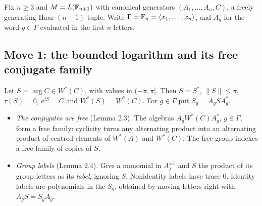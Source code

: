 \label{sec:moves}
Fix $n\ge3$ and $M=L(\mathbb F_{n+1})$ with canonical generators $(A_1,\dots,A_n,C)$, a freely generating Haar $(n+1)$-tuple. Write $\Gamma=\mathbb F_n=\langle x_1,\dots,x_n\rangle$, and
$A_g$ for the word $g\in\Gamma$ evaluated in the first $n$ letters.

\subsection{Move 1: the bounded logarithm and its free conjugate family}
Let $S=\arg C\in W^*(C)$, with values in $(-\pi,\pi]$. Then $S=S^*$, $\|S\|\le\pi$, $\tau(S)=0$, $e^{iS}=C$ and $W^*(S)=W^*(C)$. For $g\in\Gamma$ put $S_g=A_gSA_g^*$.
\begin{itemize}[leftmargin=*]
\item \emph{The conjugates are free} (Lemma 2.3). The algebras $A_gW^*(C)A_g^*$, $g\in\Gamma$, form a free family: cyclicity turns any alternating
product into an alternating product of centred elements of $W^*(A)$ and $W^*(C)$. The free group indexes a free family of copies of $S$.
\item \emph{Group labels} (Lemma 2.4). Give a monomial in $A_j^{\pm1}$ and $S$ the product of its group letters as its \emph{label}, ignoring $S$.
Nonidentity labels have trace $0$. Identity labels are polynomials in the $S_g$, obtained by moving letters right with $A_gS=S_gA_g$.
\end{itemize}


